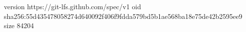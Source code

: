 version https://git-lfs.github.com/spec/v1
oid sha256:55d435478058274d640092f406f9fdda579bd5b1ae568ba18e75de42b2595ee9
size 84204

